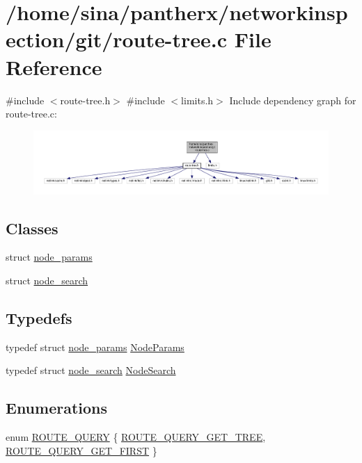 \hypertarget{route-tree_8c}{}\section{/home/sina/pantherx/networkinspection/git/route-\/tree.c File Reference}
\label{route-tree_8c}
{\ttfamily \#include $<$route-\/tree.\+h$>$}\newline
{\ttfamily \#include $<$limits.\+h$>$}\newline
Include dependency graph for route-\/tree.c\+:\nopagebreak
\begin{figure}[H]
\begin{center}
\leavevmode
\includegraphics[width=350pt]{route-tree_8c__incl}
\end{center}
\end{figure}
\subsection*{Classes}
\begin{DoxyCompactItemize}
\item 
struct \hyperlink{structnode__params}{node\+\_\+params}
\item 
struct \hyperlink{structnode__search}{node\+\_\+search}
\end{DoxyCompactItemize}
\subsection*{Typedefs}
\begin{DoxyCompactItemize}
\item 
typedef struct \hyperlink{structnode__params}{node\+\_\+params} \hyperlink{route-tree_8c_a3aa763b62cd1d285ed35bb7f0fe4d149}{Node\+Params}
\item 
typedef struct \hyperlink{structnode__search}{node\+\_\+search} \hyperlink{route-tree_8c_a26d9b840f9226a0ce349b00950ea0bdc}{Node\+Search}
\end{DoxyCompactItemize}
\subsection*{Enumerations}
\begin{DoxyCompactItemize}
\item 
enum \hyperlink{route-tree_8c_aed8cdbb52dbe32c343a8c26887888e7f}{R\+O\+U\+T\+E\+\_\+\+Q\+U\+E\+RY} \{ \hyperlink{route-tree_8c_aed8cdbb52dbe32c343a8c26887888e7fab02d9a33d5a8476efc87ecc7049cc120}{R\+O\+U\+T\+E\+\_\+\+Q\+U\+E\+R\+Y\+\_\+\+G\+E\+T\+\_\+\+T\+R\+EE}, 
\hyperlink{route-tree_8c_aed8cdbb52dbe32c343a8c26887888e7fae1f920d24672bfd2b4deee446627d969}{R\+O\+U\+T\+E\+\_\+\+Q\+U\+E\+R\+Y\+\_\+\+G\+E\+T\+\_\+\+F\+I\+R\+ST}
 \}
\end{DoxyCompactItemize}
